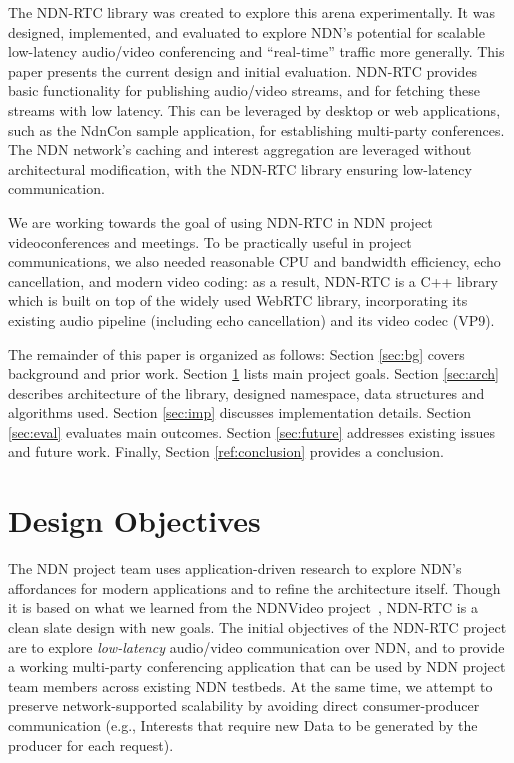\documentclass{icn/sig-alternate-2012} %
\newcommand{\ndnrtcName}{NDN-RTC} %
\newcommand{\ndnconName}{NdnCon}
\begin{document}
The \ndnrtcName{} library was created to explore this arena experimentally.  It was designed, implemented, and evaluated to explore NDN's potential for scalable low-latency audio/video conferencing and ``real-time'' traffic more generally. This paper presents the current design and initial evaluation.  \ndnrtcName{} provides basic functionality for publishing audio/video streams, and for fetching these streams with low latency.  This can be leveraged by desktop or web applications, such as the \ndnconName{} sample application, for establishing multi-party conferences. The NDN network's caching and interest aggregation are leveraged without architectural modification, with the \ndnrtcName{} library ensuring low-latency communication. 

We are working towards the goal of using \ndnrtcName{} in NDN project videoconferences and meetings.  To be practically useful in project communications, we also needed reasonable CPU and bandwidth efficiency, echo cancellation, and  modern video coding: as a result, \ndnrtcName{} is a C++ library which is built on top of the widely used WebRTC library, incorporating its existing audio pipeline (including echo cancellation) and its video codec (VP9).

The remainder of this paper is organized as follows: Section \ref{sec:bg} covers background and prior work. Section \ref{sec:goals} lists main project goals. Section \ref{sec:arch} describes architecture of the library, designed namespace, data structures and algorithms used. Section \ref{sec:imp} discusses implementation details. Section \ref{sec:eval} evaluates main outcomes. Section \ref{sec:future} addresses existing issues and future work. Finally, Section \ref{ref:conclusion} provides a conclusion.

\section{Design Objectives}
\label{sec:goals}
The NDN project team uses application-driven research to explore NDN's affordances for modern applications and to refine the architecture itself.  Though it is based on what we learned from the NDNVideo project~\cite{ndnvideo}, \ndnrtcName{} is a clean slate design with new goals.  The initial objectives of the \ndnrtcName{} project are to explore \emph{low-latency} audio/video communication over NDN, and to provide a working multi-party conferencing application that can be used by NDN project team members across existing NDN testbeds.  At the same time, we attempt to preserve network-supported scalability by avoiding direct consumer-producer communication (e.g., Interests that require new Data to be generated by the producer for each request).  
\end{document}

